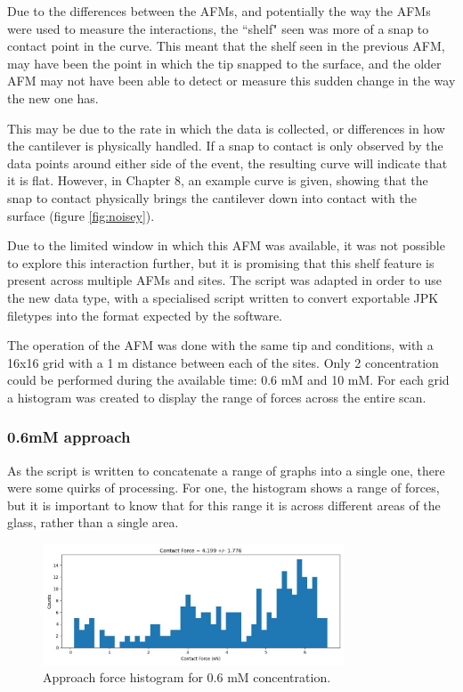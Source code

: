 Due to the differences between the AFMs, and potentially the way the AFMs were used to measure the interactions, the ``shelf" seen was more of a snap to contact point in the curve. This meant that the shelf seen in the previous AFM, may have been the point in which the tip snapped to the surface, and the older AFM may not have been able to detect or measure this sudden change in the way the new one has. 

This may be due to the rate in which the data is collected, or differences in how the cantilever is physically handled. If a snap to contact is only observed by the data points around either side of the event, the resulting curve will indicate that it is flat. However, in Chapter 8, an example curve is given, showing that the snap to contact physically brings the cantilever down into contact with the surface (figure \ref{fig:noisey}). 

Due to the limited window in which this AFM was available, it was not possible to explore this interaction further, but it is promising that this shelf feature is present across multiple AFMs and sites. The script was adapted in order to use the new data type, with a specialised script written to convert exportable JPK filetypes into the format expected by the software.

The operation of the AFM was done with the same tip and conditions, with a 16x16 grid with a 1 \textmu m distance between each of the sites. Only 2 concentration could be performed during the available time: 0.6 mM and 10 mM. For each grid a histogram was created to display the range of forces across the entire scan.

\subsubsection{0.6mM approach}

As the script is written to concatenate a range of graphs into a single one, there were some quirks of processing. For one, the histogram shows a range of forces, but it is important to know that for this range it is across different areas of the glass, rather than a single area.

\begin{figure}[h]
    \centering
    \includegraphics[width=0.8\textwidth]{chapter7/ForceMaps/0.5mM/approach_f_c_hist.jpg}
    \caption{Approach force histogram for 0.6 mM concentration.}
    \label{fig:approach_f_c_hist_0.5mM}
\end{figure}

